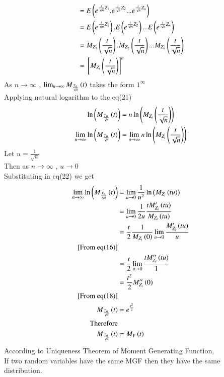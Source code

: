 \documentclass[journal,12pt,twocolumn]{IEEEtran}
\begin{document}
\begin{enumerate}[label=(\Roman*), align=left]
\begin{align}
    &=E\left(e^{\frac{t}{\sqrt{n}}Z_1}.e^{\frac{t}{\sqrt{n}}Z_2}...e^{\frac{t}{\sqrt{n}} Z_n}\right)\nonumber\\
    &=E\left(e^{\frac{t}{\sqrt{n}}Z_1}\right).E\left(e^{\frac{t}{\sqrt{n}}Z_2}\right)...E\left(e^{\frac{t}{\sqrt{n}}Z_n}\right)\nonumber\\
    &=M_{Z_1}\left(\frac{t}{\sqrt{n}}\right).M_{Z_2}\left(\frac{t}{\sqrt{n}}\right)...M_{Z_n}\left(\frac{t}{\sqrt{n}}\right)\nonumber\\
    &={}\left[M_{Z_i}\left(\frac{t}{\sqrt{n}}\right)\right]^n
    \end{align}
As $n \to \infty $ , $\lim_{n \to \infty} M_{\frac{T_n}{\sqrt{n}}}\left(t\right)$ takes the form $1^\infty$
\\Applying natural logarithm to the eq(21)
 \begin{align}
    \ln\left(M_{\frac{T_n}{\sqrt{n}}}\left(t\right)\right)&=n\ln\left(M_{Z_i}\left(\frac{t}{\sqrt{n}}\right)\right)\nonumber\\
    \lim_{n \to \infty}\ln\left(M_{\frac{T_n}{\sqrt{n}}}\left(t\right)\right)&=\lim_{n \to \infty}n\ln\left(M_{Z_i}\left(\frac{t}{\sqrt{n}}\right)\right)
    \end{align}
Let $u=\frac{1}{\sqrt{n}}$
\\Then as $n \to \infty $ , $u \to 0 $ 
\\Substituting in eq(22) we get
\begin{align}
    \lim_{n \to \infty}\ln\left(M_{\frac{T_n}{\sqrt{n}}}\left(t\right)\right)&=\lim_{u \to 0}\frac{1}{u^2}\ln\left(M_{Z_i}\left(tu\right)\right)\nonumber\\
    &=\lim_{u \to 0}\frac{1}{2u}\frac{tM_{Z_i}'\left(tu\right)}{M_{Z_i}\left(tu\right)}\nonumber\\
    &=\frac{t}{2}\frac{1}{M_{Z_i}\left(0\right)}\lim_{u \to 0}\frac{M_{Z_i}'\left(tu\right)}{u}\nonumber\\
    \text{[From eq(16)]}\nonumber\\
    &=\frac{t}{2}\lim_{u \to 0}\frac{tM_{Z_i}''\left(tu\right)}{1} \nonumber\\
    &=\frac{t^2}{2}M_{Z_i}''\left(0\right)\nonumber\\
    \text{[From eq(18)]}\nonumber\\
    M_{\frac{T_n}{\sqrt{n}}}\left(t\right)&=e^{\frac{t^2}{2}} \\
    \text{Therefore}\nonumber\\
    M_{\frac{T_n}{\sqrt{n}}}\left(t\right)&=M_Y\left(t\right)
    \end{align}
According to Uniqueness Theorem of Moment Generating Function,
\\If two random variables have the same MGF then they have the same distribution.

\end{enumerate}
\end{document}
